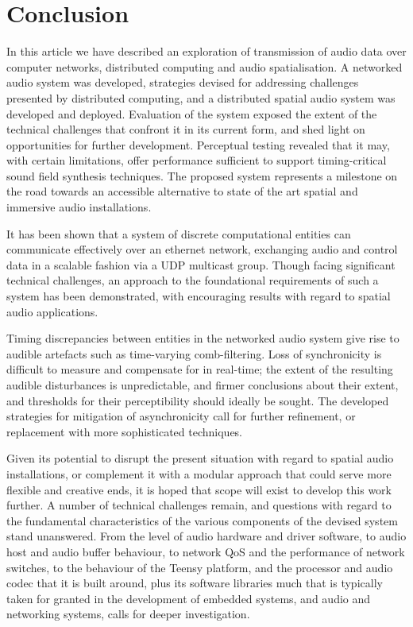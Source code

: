 \section{Conclusion}\label{sec:conclusion}

In this article we have described an exploration of transmission of audio data
over computer networks, distributed computing and audio spatialisation.
A networked audio system was developed, strategies devised for
addressing challenges presented by distributed computing, and a distributed
spatial audio system was developed and deployed.
Evaluation of the system exposed the extent of the technical challenges
that confront it in its current form, and shed light on opportunities for
further development.
Perceptual testing revealed that it may, with certain limitations, offer
performance sufficient to support timing-critical sound field synthesis
techniques.
The proposed system represents a milestone on the road towards an accessible
alternative to state of the art spatial and immersive audio installations.

It has been shown that a system of discrete computational entities can
communicate effectively over an ethernet network, exchanging audio and control
data in a scalable fashion via a UDP multicast group.
Though facing significant technical challenges, an approach to the foundational
requirements of such a system has been demonstrated, with encouraging results
with regard to spatial audio applications.

Timing discrepancies between entities in the networked audio system give rise
to audible artefacts such as time-varying comb-filtering.
Loss of synchronicity is difficult to measure and compensate for in real-time;
the extent of the resulting audible disturbances is unpredictable, and firmer
conclusions about their extent, and thresholds for their perceptibility should
ideally be sought.
The developed strategies for mitigation of asynchronicity call for further
refinement, or replacement with more sophisticated techniques.

Given its potential to disrupt the present situation with regard to spatial
audio installations, or complement it with a modular approach that could serve
more flexible and creative ends, it is hoped that scope will exist to develop
this work further.
A number of technical challenges remain, and questions with regard to the
fundamental characteristics of the various components of the devised system
stand unanswered.
From the level of audio hardware and driver software, to audio host and audio
buffer behaviour, to network QoS and the performance of network switches, to
the behaviour of the Teensy platform, and the processor and audio codec that it
is built around, plus its software libraries \textemdash{} much that is
typically taken for granted in the development of embedded systems, and audio
and networking systems, calls for deeper investigation.

